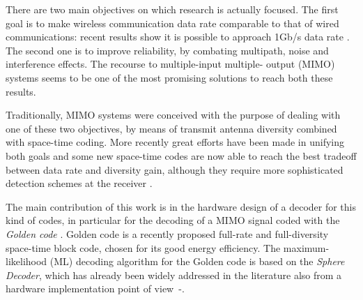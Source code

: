 \documentclass[12pt,onecolumn,draftclsnofoot]{IEEEtran}
\begin{document}
There are two main objectives on which research is actually
focused. The first goal is to make wireless communication data rate comparable
to that
of wired communications: recent results show it is possible to approach 1Gb/s
data rate\cite{gigabit, gigabit2} . The second one is to improve reliability,
by combating multipath,
noise and interference effects. The recourse to multiple-input multiple-
output (MIMO) systems seems to be one of the most promising solutions to reach both
these results.

Traditionally, MIMO systems were conceived with the purpose of dealing with one of these two
objectives, by means of transmit antenna diversity combined with space-time
coding.
More recently great efforts have been made in unifying both goals and
some new space-time codes are now able to reach the best tradeoff between data rate
and diversity gain, although they require more sophisticated detection schemes
at the receiver \cite{LD-STBC, CODES2, CODES3, Golden1, Golden2, Golden3}.

The main contribution of this work is in the hardware design of a
decoder for this kind of codes, in particular for the decoding of a
 MIMO signal coded with the {\em Golden code}
\cite{Golden1}. Golden code is a recently proposed full-rate and
full-diversity space-time block code, chosen for its good energy
efficiency. The maximum-likelihood (ML) decoding algorithm for the Golden
code is based on the \emph{Sphere Decoder}, which has already been
widely addressed in the literature also from a hardware
implementation point of view~\cite{ControCompl}-\cite{Kbest}.
\end{document}
